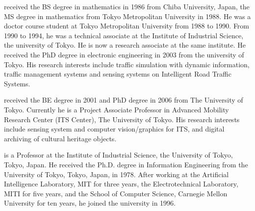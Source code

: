 \documentclass{mva2011}
\begin{document}
 received the BS degree in mathematics in 1986
from Chiba University, Japan, the MS degree in mathematics
from Tokyo Metropolitan University in 1988.  He was a doctor
course student at Tokyo Metropolitan University from 1988 to
1990.  From 1990 to 1994, he was a technical associate at the
Institute of Industrial Science, the university of Tokyo.
He is now a research associate at the same institute.
He received the PhD degree in electronic engineering in 2003 from the
university of Tokyo.
His research
interests include traffic simulation with dynamic information,
traffic management systems and sensing systems on Intelligent
Road Traffic Systems.

 received the BE degree in 2001 and PhD degree in 2006 from The University of Tokyo.
  Currently he is a Project Associate Professor in Advanced Mobility Research
Center (ITS Center), The University of Tokyo.
His research interests include sensing system and computer vision/graphics for ITS, and digital archiving of cultural heritage objects.

  is a Professor at the Institute of Industrial Science, the University of Tokyo, Tokyo, Japan. He received the Ph.D. degree in  Information Engineering from the University of Tokyo, Tokyo, Japan, in 1978.  After working at the Artificial Intelligence Laboratory, MIT for three  years, the Electrotechnical Laboratory, MITI for five years, and the School  of Computer Science, Carnegie Mellon University for ten years, he joined the  university in 1996.
\end{document}
